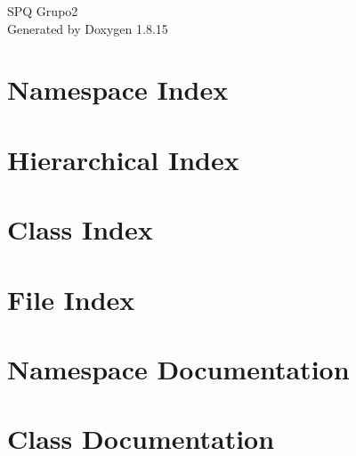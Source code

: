 \let\mypdfximage\pdfximage\def\pdfximage{\immediate\mypdfximage}\documentclass[twoside]{book}
\newcommand{\+}{\discretionary{\mbox{\scriptsize$\hookleftarrow$}}{}{}}
\newcommand{\clearemptydoublepage}{%
  \newpage{\pagestyle{empty}\cleardoublepage}%
}
\begin{document}
\hypersetup{pageanchor=false,
             bookmarksnumbered=true,
             pdfencoding=unicode
            }
\begin{titlepage}
\vspace*{7cm}
\begin{center}%
{\Large S\+PQ Grupo2 }\\
\vspace*{1cm}
{\large Generated by Doxygen 1.8.15}\\
\end{center}
\end{titlepage}
\clearemptydoublepage
{}
\tableofcontents
\clearemptydoublepage
{}
\hypersetup{pageanchor=true}

\chapter{Namespace Index}

\chapter{Hierarchical Index}

\chapter{Class Index}

\chapter{File Index}

\chapter{Namespace Documentation}





\chapter{Class Documentation}























\end{document}
